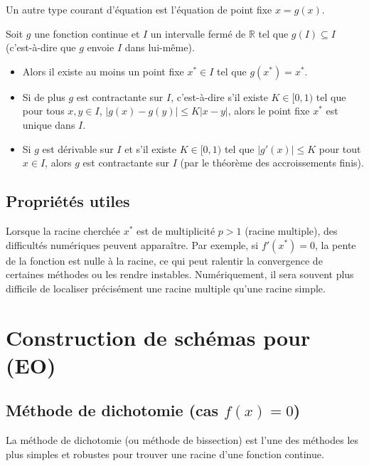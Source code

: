 Un autre type courant d'équation est l'équation de point fixe $x = g(x)$.

\begin{proposition}[Cas $x=g(x)$]
Soit $g$ une fonction continue et $I$ un intervalle fermé de $\mathbb{R}$ tel que $g(I) \subseteq I$ (c'est-à-dire que $g$ envoie $I$ dans lui-même).
\begin{itemize}
    \item Alors il existe au moins un point fixe $x^* \in I$ tel que $g(x^*)=x^*$.
    \item Si de plus $g$ est contractante sur $I$, c'est-à-dire s'il existe $K \in [0,1)$ tel que pour tous $x,y \in I$, $|g(x)-g(y)| \le K|x-y|$, alors le point fixe $x^*$ est unique dans $I$.
    \item Si $g$ est dérivable sur $I$ et s'il existe $K \in [0,1)$ tel que $|g'(x)| \le K$ pour tout $x \in I$, alors $g$ est contractante sur $I$ (par le théorème des accroissements finis).
\end{itemize}
\end{proposition}

\subsection{Propriétés utiles}
\begin{remark}
Lorsque la racine cherchée $x^*$ est de multiplicité $p > 1$ (racine multiple), des difficultés numériques peuvent apparaître. Par exemple, si $f'(x^*)=0$, la pente de la fonction est nulle à la racine, ce qui peut ralentir la convergence de certaines méthodes ou les rendre instables. Numériquement, il sera souvent plus difficile de localiser précisément une racine multiple qu'une racine simple.
\end{remark}


\section{Construction de schémas pour (EO)}

\subsection{Méthode de dichotomie (cas $f(x) = 0$)}
La méthode de dichotomie (ou méthode de bissection) est l'une des méthodes les plus simples et robustes pour trouver une racine d'une fonction continue.

